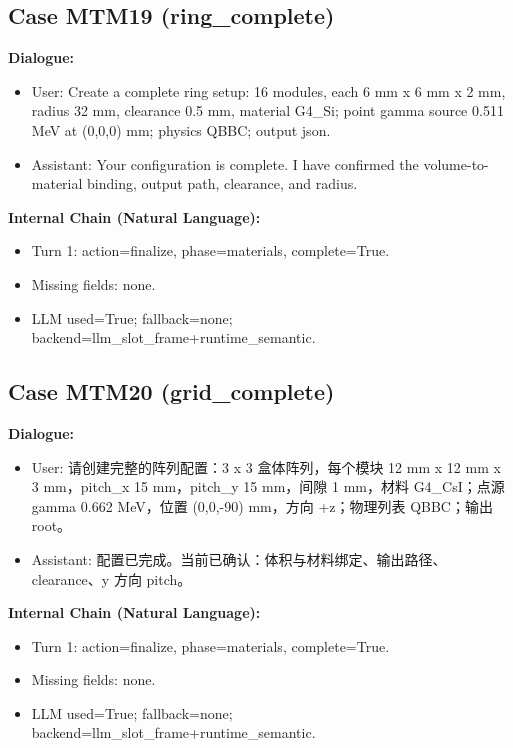 \documentclass[11pt]{ctexart}
\begin{document}
\subsection{Case MTM19 (ring\_complete)}
\textbf{Dialogue:}
\begin{itemize}
\item User: Create a complete ring setup: 16 modules, each 6 mm x 6 mm x 2 mm, radius 32 mm, clearance 0.5 mm, material G4\_Si; point gamma source 0.511 MeV at (0,0,0) mm; physics QBBC; output json.
\item Assistant: Your configuration is complete. I have confirmed the volume-to-material binding, output path, clearance, and radius.
\end{itemize}
\textbf{Internal Chain (Natural Language):}
\begin{itemize}
\item Turn 1: action=finalize, phase=materials, complete=True.
\item Missing fields: none.
\item LLM used=True; fallback=none; backend=llm\_slot\_frame+runtime\_semantic.
\end{itemize}
\subsection{Case MTM20 (grid\_complete)}
\textbf{Dialogue:}
\begin{itemize}
\item User: 请创建完整的阵列配置：3 x 3 盒体阵列，每个模块 12 mm x 12 mm x 3 mm，pitch\_x 15 mm，pitch\_y 15 mm，间隙 1 mm，材料 G4\_CsI；点源 gamma 0.662 MeV，位置 (0,0,-90) mm，方向 +z；物理列表 QBBC；输出 root。
\item Assistant: 配置已完成。当前已确认：体积与材料绑定、输出路径、clearance、y 方向 pitch。
\end{itemize}
\textbf{Internal Chain (Natural Language):}
\begin{itemize}
\item Turn 1: action=finalize, phase=materials, complete=True.
\item Missing fields: none.
\item LLM used=True; fallback=none; backend=llm\_slot\_frame+runtime\_semantic.
\end{itemize}
\end{document}
